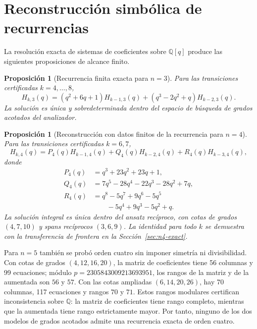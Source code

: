 \documentclass[11pt,a4paper]{article}
\newtheorem{proposition}[theorem]{Proposición}
\theoremstyle{definition}
\begin{document}
\section{Reconstrucción simbólica de recurrencias}

La resolución exacta de sistemas de coeficientes sobre $\mathbb Q[q]$ produce las siguientes proposiciones de alcance finito.

\begin{proposition}[Recurrencia finita exacta para $n=3$]
\label{prop:rec-n3}
Para las transiciones certificadas $k=4,\ldots,8$,
\[
H_{k,3}(q)=(q^2+6q+1)H_{k-1,3}(q)
+(q^3-2q^2+q)H_{k-2,3}(q).
\]
La solución es única y sobredeterminada dentro del espacio de búsqueda de grados acotados del analizador.
\end{proposition}

\begin{proposition}[Reconstrucción con datos finitos de la recurrencia para $n=4$]
\label{prop:rec-n4}
Para las transiciones certificadas $k=6,7$,
\begin{equation}\label{eq:rec-n4}
H_{k,4}(q)=P_4(q)H_{k-1,4}(q)+Q_4(q)H_{k-2,4}(q)+R_4(q)H_{k-3,4}(q),
\end{equation}
donde
\begin{align*}
P_4(q)&=q^3+23q^2+23q+1,\\
Q_4(q)&=7q^5-28q^4-22q^3-28q^2+7q,\\
R_4(q)&=q^8-5q^7+9q^6-5q^5\\
&\qquad{}-5q^4+9q^3-5q^2+q.
\end{align*}
La solución integral es única dentro del ansatz recíproco, con cotas de grados $(4,7,10)$ y spans recíprocos $(3,6,9)$. La identidad para todo $k$ se demuestra con la transferencia de frontera en la Sección~\ref{sec:n4-exact}.
\end{proposition}

Para $n=5$ también se probó orden cuatro sin imponer simetría ni
divisibilidad. Con cotas de grados $(4,12,16,20)$, la matriz de
coeficientes tiene 56 columnas y 99 ecuaciones; módulo
$p=2305843009213693951$, los rangos de la matriz y de la aumentada son
$56$ y $57$. Con las cotas ampliadas $(6,14,20,26)$, hay 70 columnas,
117 ecuaciones y rangos $70$ y $71$. Estos rangos modulares certifican
inconsistencia sobre $\mathbb Q$: la matriz de coeficientes tiene rango
completo, mientras que la aumentada tiene rango estrictamente mayor. Por
tanto, ninguno de los dos modelos de grados acotados admite una
recurrencia exacta de orden cuatro.
\end{document}
